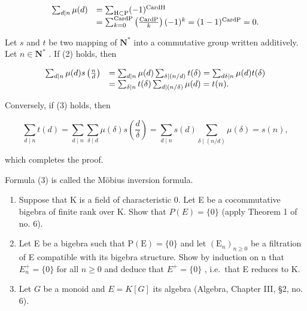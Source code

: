 \[
\begin{array}{r l} \sum_ {d | n} \mu (d) & = \sum_ {\mathrm{H} \subset \mathrm{P}} (- 1) ^ {\mathrm{CardH}} \\ & = \sum_ {k = 0} ^ {\mathrm{CardP}} \left(\frac {\mathrm{CardP}}{k}\right) (- 1) ^ {k} = (1 - 1) ^ {\mathrm{CardP}} = 0. \end{array}
\]


Let \(s\) and \(t\) be two mapping of \(\mathbf{N}^*\) into a commutative group written additively. Let \(n \in \mathbf{N}^*\) . If (2) holds, then

\[
\begin{array}{r l} \sum_ {d | n} \mu (d) s \left(\frac {n}{d}\right) & = \sum_ {d | n} \mu (d) \sum_ {\delta \mid (n / d)} t (\delta) = \sum_ {d \delta | n} \mu (d) t (\delta) \\ & = \sum_ {\delta | n} t (\delta) \sum_ {d \mid (n / \delta)} \mu (d) = t (n). \end{array}
\]

Conversely, if (3) holds, then

\[
\sum_ {d \mid n} t (d) = \sum_ {d \mid n} \sum_ {\delta \mid d} \mu (\delta) s \left(\frac {d}{\delta}\right) = \sum_ {d \mid n} s (d) \sum_ {\delta \mid (n / d)} \mu (\delta) = s (n),
\]

which completes the proof.

Formula (3) is called the Möbius inversion formula.




\begin{enumerate}
\def\labelenumi{\arabic{enumi}.}
\item
  Suppose that K is a field of characteristic 0. Let E be a cocommutative bigebra of finite rank over K. Show that \(P(E) = \{0\}\) (apply Theorem 1 of no. 6).
\item
  Let E be a bigebra such that \(\mathrm{P}(\mathrm{E})=\{0\}\) and let \((\mathrm{E}_{n})_{n\geqslant0}\) be a filtration of E compatible with its bigebra structure. Show by induction on n that \(E_{n}^{+}=\{0\}\) for all \(n\geqslant0\) and deduce that \(E^{+}=\{0\}\) , i.e.~that E reduces to K.
\item
  Let \(G\) be a monoid and \(E = K[G]\) its algebra (Algebra, Chapter III, §2, no. 6).
\end{enumerate}

